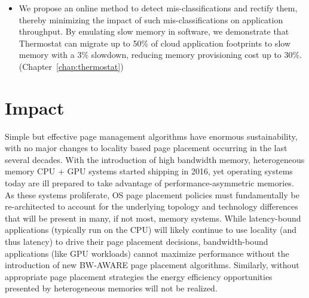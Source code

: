 \begin{itemize}
\item
We propose an online method to detect mis-classifications and rectify them,
thereby minimizing the impact of such mis-classifications on application
throughput.  By emulating slow memory in software, we demonstrate that
Thermostat can migrate up to 50\% of cloud application footprints to slow memory
with a 3\% slowdown, reducing memory provisioning cost up to 30\%.
(Chapter~\ref{chap:thermostat})
\end{itemize}

\section{Impact}
Simple but effective page management algorithms have enormous sustainability, with no
major changes to locality based page placement occurring in the last several
decades. With the introduction of high bandwidth memory, heterogeneous memory
CPU + GPU systems started shipping in 2016, yet operating systems today are ill
prepared to take advantage of performance-asymmetric memories. As these systems
proliferate, OS page placement policies must fundamentally be re-architected to
account for the underlying topology and technology differences that will be
present in many, if not most, memory systems. While latency-bound applications
(typically run on the CPU) will likely continue to use locality (and thus
latency) to drive their page placement decisions, bandwidth-bound applications
(like GPU workloads) cannot maximize performance without the introduction of new
BW-AWARE page placement algorithms. Similarly, without appropriate page
placement strategies the energy efficiency opportunities presented by
heterogeneous memories will not be realized.


